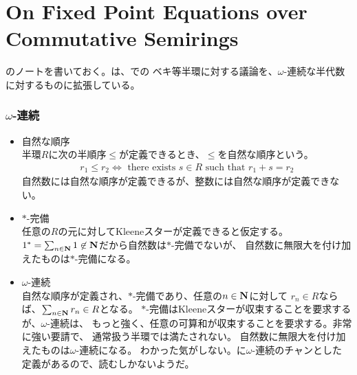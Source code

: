 \begingroup %
\newcommand{\bou}{{\,|\,}}
\newcommand{\boug}{{\,\big|\,}}
\newcommand{\bougg}{{\,\bigg|\,}}
\newcommand{\word}[1]{{|\!\lfloor{#1}\rfloor\!|}}
{\setlength\arraycolsep{2pt}
%
\section{On Fixed Point Equations over Commutative Semirings}\label{s1:EKL07} %
	\cite{EKL07}のノートを書いておく。\cite{EKL07}は、\cite{Hopkins99}での
	ベキ等半環に対する議論を、$\omega$-連続な半代数に対するものに拡張している。

\subsubsection{$\omega$-連続}\label{s3:オメガ-連続} %
	\begin{itemize}\setlength{\itemsep}{-1mm} %
		\item 自然な順序 \\
		半環$R$に次の半順序$\le$が定義できるとき、$\le$を自然な順序という。
		\begin{equation*}\begin{split}
			r_1\le r_2 \iff \text{ there exists } s\in R \text{ such that } 
			r_1 + s = r_2
		\end{split}\end{equation*}
		自然数には自然な順序が定義できるが、整数には自然な順序が定義できない。
		\item $*$-完備 \\
		任意の$R$の元に対してKleeneスターが定義できると仮定する。
		$1^*=\sum_{n\in\mathbf{N}}1\not\in\mathbf{N}$だから自然数は$*$-完備でないが、
		自然数に無限大を付け加えたものは$*$-完備になる。
		\item $\omega$-連続 \\
		自然な順序が定義され、$*$-完備であり、任意の$n\in\mathbf{N}$に対して
		$r_n\in R$ならば、$\sum_{n\in\mathbf{N}}r_n\in R$となる。
		$*$-完備はKleeneスターが収束することを要求するが、$\omega$-連続は、
		もっと強く、任意の可算和が収束することを要求する。非常に強い要請で、
		通常扱う半環では満たされない。
		自然数に無限大を付け加えたものは$\omega$-連続になる。
		わかった気がしない。\cite{esik2007modern}に$\omega$-連続のチャンとした
		定義があるので、読むしかないようだ。
	\end{itemize} %

}
